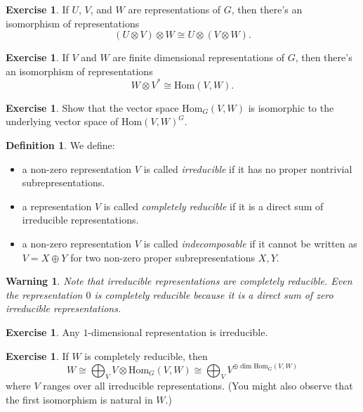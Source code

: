 \documentclass[11pt]{article}
\theoremstyle{plain}
\newtheorem{warning}[proposition]{Warning}
\theoremstyle{definition}
\newtheorem{definition}[proposition]{Definition}
\newtheorem{exercise}[proposition]{Exercise}
\theoremstyle{remark}
\begin{document}
\begin{exercise}
If $U$, $V$, and $W$ are representations of $G$, then there's an isomorphism of representations
$$(U \otimes V) \otimes W \cong U \otimes (V \otimes W).$$
\end{exercise}

\begin{exercise}
If $V$ and $W$ are finite dimensional representations of $G$, then there's an isomorphism of representations
$$W \otimes V^* \cong \mathrm{Hom}(V,W).$$
\end{exercise}

\begin{exercise}
Show that the vector space $\mathrm{Hom}_G(V,W)$ is isomorphic to the underlying vector space of $\mathrm{Hom}(V,W)^G$. 
\end{exercise}

\begin{definition}  We define:
\begin{itemize}
\item a non-zero representation $V$ is called \emph{irreducible} if it has no proper nontrivial subrepresentations.
\item a representation $V$ is called \emph{completely reducible} if it is a direct sum of irreducible representations.
\item a non-zero representation $V$ is called \emph{indecomposable} if it cannot be written as $V = X \oplus Y$ for two non-zero proper subrepresentations $X, Y$.
\end{itemize}
\end{definition}

\begin{warning}
Note that irreducible representations are completely reducible.  Even the representation $0$ is completely reducible because it is a direct sum of zero irreducible representations.
\end{warning}

\begin{exercise}
Any $1$-dimensional representation is irreducible.
\end{exercise}

\begin{exercise}
If $W$ is completely reducible, then
$$ W \cong \bigoplus_{V} V \otimes \mathrm{Hom}_G(V, W) \cong \bigoplus_{V} V^{\oplus \dim \mathrm{Hom}_G(V, W)} $$
where $V$ ranges over all irreducible representations.
(You might also observe that the first isomorphism is natural in $W$.)
\end{exercise}
\end{document}
